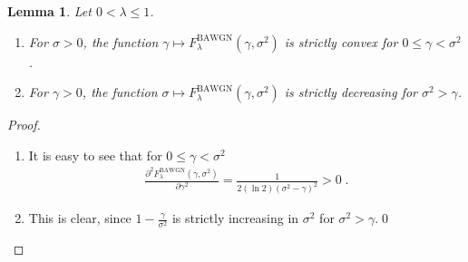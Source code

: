 \documentclass{article}
\DeclareMathOperator{\BAWGN}{BAWGN}
\theoremstyle{plain}
\theoremstyle{plain}
\theoremstyle{plain}
\theoremstyle{plain}
\theoremstyle{plain}
\theoremstyle{plain}
\theoremstyle{plain}
\newtheorem{lemma}[definition]{Lemma}%
\theoremstyle{plain}
\theoremstyle{plain}
\theoremstyle{plain}
\theoremstyle{remark}
\theoremstyle{remark}
\theoremstyle{remark}
\theoremstyle{plain}
\begin{document}
\begin{lemma}
    Let $0 <\lambda\le 1$.
    \begin{enumerate}[1)]
        \item For $\sigma>0$, the function $\gamma\mapsto F^{\BAWGN}_{\lambda}(\gamma,\sigma^2)$ is strictly convex for $0\le \gamma<\sigma^2$.
        \item For $\gamma>0$, the function $\sigma\mapsto F^{\BAWGN}_{\lambda}(\gamma,\sigma^2)$ 
        is strictly decreasing for $\sigma^2>\gamma$.
    \end{enumerate}
\end{lemma}
\begin{proof}
    \begin{enumerate}[1)]
        \item It is easy to see that for $0\le\gamma<\sigma^2$ \begin{align*}
            \frac{\partial^2 F^{\BAWGN}_{\lambda}(\gamma,\sigma^2)}{\partial\gamma^2}=\frac{1}{2(\ln 2)(\sigma^2-\gamma)^2}>0\;. 
        \end{align*}
        \item This is clear,
        since $1-\frac{\gamma}{\sigma^2}$ is strictly
        increasing in $\sigma^2$ for
        $\sigma^2>\gamma$.\qed
    \end{enumerate}
    \renewcommand{\qedsymbol}{}
\end{proof}
\end{document}
